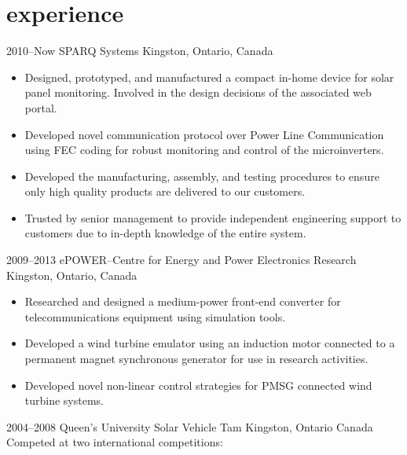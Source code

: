 
\section{experience}

\begin{entrylist}
\entry
  {2010--Now}
  {SPARQ Systems}
  {Kingston, Ontario, Canada}
  {
\begin{itemize}
\item Designed, prototyped, and manufactured a compact in-home device for solar panel monitoring. Involved in the design decisions of the associated web portal.
\item Developed novel communication protocol over Power Line Communication using FEC coding for robust monitoring and control of the microinverters.
\item Developed the manufacturing, assembly, and testing procedures to ensure only high quality products are delivered to our customers.
\item Trusted by senior management to provide independent engineering support to customers due to in-depth knowledge of the entire system.
\end{itemize}
}
\entry
  {2009--2013}
  {ePOWER--Centre for Energy and Power Electronics Research}
  {Kingston, Ontario, Canada}
  {
  \begin{itemize}
    \item Researched and designed a medium-power front-end converter for telecommunications equipment using simulation tools. 
    \item Developed a wind turbine emulator using an induction motor connected to a permanent magnet synchronous generator for use in research activities.
    \item Developed novel non-linear control strategies for PMSG connected wind turbine systems.
  \end{itemize}}
\entry
  {2004--2008}
  {Queen's University Solar Vehicle Tam}
  {Kingston, Ontario Canada}
  {\\
  Competed at two international competitions:
}
\end{entrylist}
